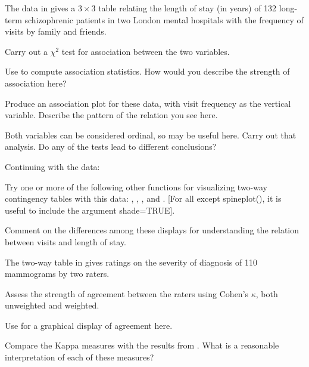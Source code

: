 \documentclass[10pt,krantz2]{krantz}\usepackage[]{graphicx}\usepackage[]{color}
\begin{document}
\begin{Exercises}
  \exercise The  data in  gives a $3 \times 3$ table
  relating the length of stay (in years) of 132 long-term schizophrenic patients in two London mental hospitals with the frequency of visits
  by family and friends.
    \begin{enumerate*}
      \item Carry out a  $\chi^2$ test for association between the two
      variables.
      \item Use  to compute association statistics.
      How would you describe the strength of association here?
      \item Produce an association plot for these data, with
      visit frequency as the vertical variable.  Describe the
      pattern of the relation you see here.
      \item Both variables can be considered ordinal, so
       may be useful here.  Carry out that
      analysis.  Do any of the tests lead to different conclusions?
    \end{enumerate*}

  \exercise Continuing with the  data:
    \begin{enumerate*}
      \item Try one or more of the following other functions for visualizing two-way contingency tables with this data: 
      , , , and .  
      [For all except spineplot(), it is useful to include the argument shade=TRUE].
      \item Comment on the differences among these displays for understanding the relation between visits and length of stay.
    \end{enumerate*}
  
  \exercise The two-way table  in  gives ratings
  on the severity of diagnosis of 110 mammograms by two raters.
    \begin{enumerate*}
      \item Assess the strength of agreement between the raters using Cohen's
      $\kappa$, both unweighted and weighted.
      \item Use  for a graphical display of agreement here.
      \item Compare the Kappa measures with the results from . 
      What is a reasonable interpretation of each of these measures?
    \end{enumerate*}


\end{Exercises}
\end{document}
